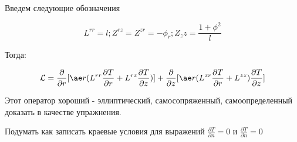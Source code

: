 \documentclass[12pt, a4paper]{article}
\begin{document}
Введем следующие обозначения

\[ L^{rr} = l; Z^{rz} = Z^{zr} = - \phi_r; Z_zz = \frac{1 + \phi^2}{l} \]

Тогда:

\[ \mathcal{L} = \frac{\partial }{\partial r} [\ae r (L^{rr}\frac{\partial T}{\partial r} + L^{rz} \frac{\partial T}{\partial z})] + \frac{\partial }{\partial z}[\ae r (L^{zr} \frac{\partial T}{\partial r} + L^{zz}) \frac{\partial T}{\partial z}] \]

Этот оператор хороший - эллиптический, самосопряженный, самоопределенный доказать в качестве упражнения.

Подумать как записать краевые условия для выражений $ \frac{\partial T}{\partial n} = 0 $ и $ \frac{\partial T}{\partial n} = 0$
\end{document}
